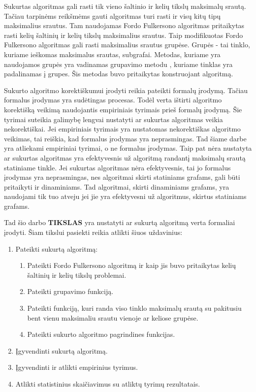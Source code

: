 Sukurtas algoritmas gali rasti  tik vieno šaltinio ir kelių tikslų maksimalų srautą. Tačiau tarpinėms reikšmėms gauti algoritmas turi rasti ir visų kitų tipų maksimalius srautus. Tam naudojamas Fordo Fulkersono algoritmas  \cite{FiN} pritaikytas rasti kelių šaltinių ir kelių tikslų maksimalius srautus. Taip modifikuotas Fordo Fulkersono algoritmas gali rasti maksimalius srautus grupėse. Grupės - tai tinklo, kuriame ieškomas maksimalus srautas, subgrafai. Metodas, kuriame yra naudojamos grupės yra vadinamas grupavimo metodu \cite{DSfUoMST}, kuriame tinklas yra padalinamas į grupes. Šis metodas buvo pritaikytas konstruojant algoritmą.

Sukurto algoritmo korektiškumui įrodyti reikia pateikti formalų įrodymą. Tačiau formalus įrodymas yra sudėtingas procesas. Todėl verta ištirti algoritmo korektišką veikimą naudojantis empiriniais tyrimais prieš formalų įrodymą. Šie tyrimai suteikia galimybę lengvai nustatyti ar sukurtas algoritmas veikia nekorektiškai. Jei empiriniais tyrimais yra nustatomas nekorektiškas algoritmo veikimas, tai reiškia, kad formalus įrodymas yra neprasmingas. Tad šiame darbe yra atliekami empiriniai tyrimai, o ne formalus įrodymas. Taip pat nėra nustatyta ar sukurtas algoritmas yra efektyvesnis už algoritmą randantį maksimalų srautą statiniame tinkle. Jei sukurtas algoritmas nėra efektyvesnis, tai jo formalus įrodymas yra neprasmingas, nes algoritmai skirti statiniams grafams, gali būti pritaikyti ir dinaminiams. Tad algoritmai, skirti dinaminiams grafams, yra naudojami tik tuo atveju jei jie yra efektyvesni už algoritmus, skirtus statiniams grafams.

Tad šio darbo \textbf{TIKSLAS} yra nustatyti ar sukurtą algoritmą verta formaliai įrodyti. Šiam tikslui pasiekti reikia atlikti šiuos uždavinius:
\begin{enumerate}
	\item Pateikti sukurtą algoritmą:	
	\begin{enumerate}
		\item  Pateikti Fordo Fulkersono algoritmą ir kaip jis buvo pritaikytas kelių šaltinių ir kelių tikslų problemai.
		\item Pateikti grupavimo funkciją.
		\item Pateikti funkciją, kuri randa viso tinklo maksimalų srautą su pakitusiu bent vienu maksimaliu srautu vienoje ar keliose grupėse.
		\item Pateikti sukurto algoritmo pagrindines funkcijas.
	\end{enumerate}
	\item Įgyvendinti sukurtą algoritmą.
	\item Įgyvendinti ir atlikti empirinius tyrimus.
	\item Atlikti statistinius skaičiavimus su atliktų tyrimų rezultatais.
\end{enumerate}

